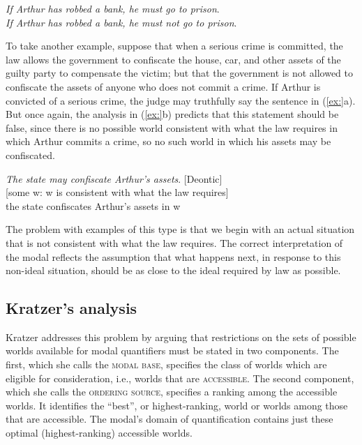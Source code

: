 \ea
\ea \textit{If Arthur has robbed a bank, he} \textit{must go to prison}.\\
\ex \textit{If Arthur has robbed a bank, he} \textit{must not go to prison}.
                       \z
\z


To take another example, suppose that when a serious crime is committed, the law allows the government to confiscate the house, car, and other assets of the guilty party to compensate the victim; but that the government is not allowed to confiscate the assets of anyone who does not commit a crime. If Arthur is convicted of a serious crime, the judge may truthfully say the sentence in (\ref{ex:}a). But once again, the analysis in (\ref{ex:}b) predicts that this statement should be false, since there is no possible world consistent with what the law requires in which Arthur commits a crime, so no such world in which his assets may be confiscated.


\ea
\ea \textit{The state may confiscate Arthur’s assets}.  [Deontic]\\
\ex{} [some w: w is consistent with what the law requires]\\
  the state confiscates Arthur’s assets in w
\z
\z


The problem with examples of this type is that we begin with an actual situation that is not consistent with what the law requires. The correct interpretation of the modal reflects the assumption that what happens next, in response to this non-ideal situation, should be as close to the ideal required by law as possible.


\subsection{Kratzer’s analysis}\label{sec:} %

Kratzer addresses this problem by arguing that restrictions on the sets of possible worlds available for modal quantifiers must be stated in two components. The first, which she calls the \textsc{modal base}, specifies the class of worlds which are eligible for consideration, i.e., worlds that are \textsc{accessible}. The second component, which she calls the \textsc{ordering source}, specifies a ranking among the accessible worlds. It identifies the “best”, or highest-ranking, world or worlds among those that are accessible. The modal’s domain of quantification contains just these optimal (highest-ranking) accessible worlds.



